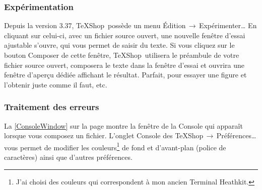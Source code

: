 \documentclass[11pt,french]{article}
\newcommand{\TS}{\textsf{\TeX Shop}}
\newcommand{\cmd}[1]{\textsf{#1}}
\newcommand{\mnu}[1]{\textsf{#1}}
\newcommand{\To}{\,\(\to\)\,}
\begin{document}
\subsubsection{Expérimentation}  


Depuis la version 3.37, \TS\ possède un menu \mnu{Édition}\To\mnu {Expérimenter…} En cliquant sur celui-ci, avec un fichier source ouvert, une nouvelle fenêtre d'essai ajustable s'ouvre, qui vous permet de saisir du texte. Si vous cliquez sur le bouton \mnu{Composer} de cette fenêtre, \TS\ utilisera le préambule de votre fichier source ouvert, composera le texte dans la fenêtre d'essai et ouvrira une fenêtre d'aperçu dédiée affichant le résultat. Parfait, pour essayer une figure et l'obtenir juste comme il faut, etc.


\subsubsection{Traitement des erreurs}



La \cref{ConsoleWindow} sur la page  montre la fenêtre de la \cmd{Console} qui apparaît lorsque vous composez un fichier. L'onglet \cmd{Console} des \mnu{TeXShop}\To\mnu{Préférences…} vous permet de modifier les couleurs\footnote{J'ai choisi des couleurs qui correspondent à mon ancien Terminal Heathkit.} de fond et d'avant-plan (police de caractères) ainsi que d'autres préférences.
\end{document}
